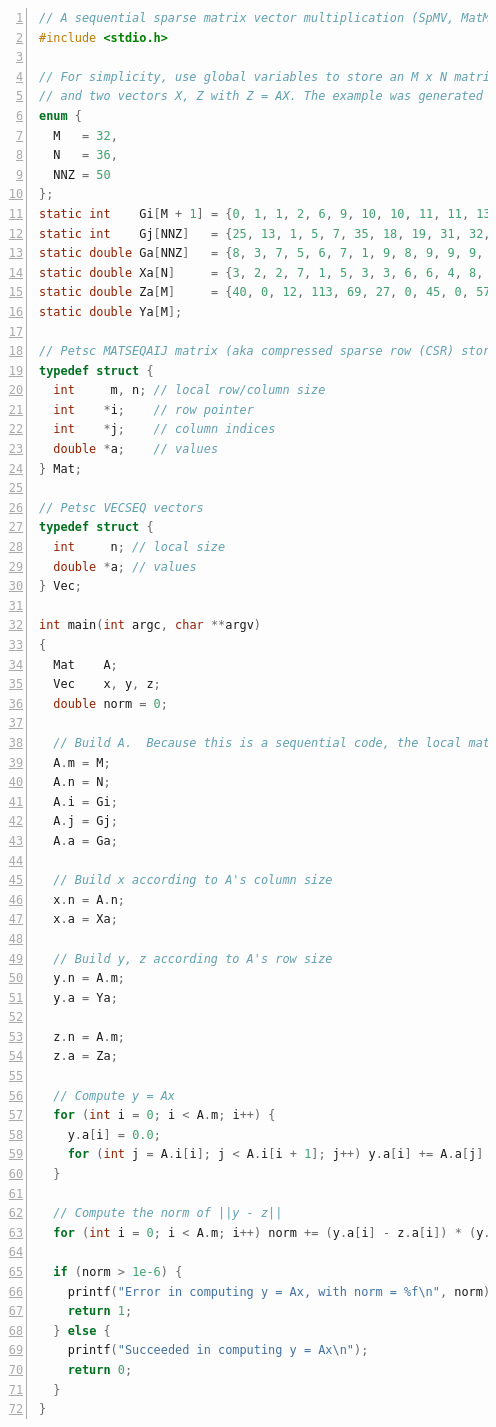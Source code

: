 \documentclass[creativecommons]{eptcs}
\begin{document}
\begin{lstlisting}[language=C, numbers=left]
// A sequential sparse matrix vector multiplication (SpMV, MatMult in PETSc)
#include <stdio.h>

// For simplicity, use global variables to store an M x N matrix A with NNZ nonzeros in the CSR format,
// and two vectors X, Z with Z = AX. The example was generated by the Python script crs.py
enum {
  M   = 32,
  N   = 36,
  NNZ = 50
};
static int    Gi[M + 1] = {0, 1, 1, 2, 6, 9, 10, 10, 11, 11, 13, 13, 13, 16, 17, 18, 18, 19, 20, 22, 23, 27, 28, 31, 32, 34, 37, 37, 41, 44, 44, 47, 49};
static int    Gj[NNZ]   = {25, 13, 1, 5, 7, 35, 18, 19, 31, 32, 21, 32, 33, 0, 8, 27, 16, 25, 3, 24, 17, 27, 13, 3, 28, 29, 30, 2, 23, 29, 31, 10, 8, 29, 1, 20, 22, 3, 8, 16, 19, 10, 14, 24, 2, 6, 15, 17, 34};
static double Ga[NNZ]   = {8, 3, 7, 5, 6, 7, 1, 9, 8, 9, 9, 9, 5, 1, 5, 8, 4, 4, 2, 11, 3, 8, 9, 7, 7, 4, 2, 2, 7, 6, 9, 3, 4, 2, 2, 9, 7, 4, 7, 8, 1, 8, 6, 1, 3, 3, 6, 6, 1};
static double Xa[N]     = {3, 2, 2, 7, 1, 5, 3, 3, 6, 6, 4, 8, 8, 4, 7, 8, 9, 7, 7, 6, 9, 5, 8, 5, 7, 5, 5, 5, 2, 4, 8, 1, 3, 6, 9, 8};
static double Za[M]     = {40, 0, 12, 113, 69, 27, 0, 45, 0, 57, 0, 0, 73, 36, 20, 0, 14, 77, 61, 36, 95, 4, 68, 12, 32, 141, 0, 148, 81, 0, 63, 51};
static double Ya[M];

// Petsc MATSEQAIJ matrix (aka compressed sparse row (CSR) storage)
typedef struct {
  int     m, n; // local row/column size
  int    *i;    // row pointer
  int    *j;    // column indices
  double *a;    // values
} Mat;

// Petsc VECSEQ vectors
typedef struct {
  int     n; // local size
  double *a; // values
} Vec;

int main(int argc, char **argv)
{
  Mat    A;
  Vec    x, y, z;
  double norm = 0;

  // Build A.  Because this is a sequential code, the local matrix takes all
  A.m = M;
  A.n = N;
  A.i = Gi;
  A.j = Gj;
  A.a = Ga;

  // Build x according to A's column size
  x.n = A.n;
  x.a = Xa;

  // Build y, z according to A's row size
  y.n = A.m;
  y.a = Ya;

  z.n = A.m;
  z.a = Za;

  // Compute y = Ax
  for (int i = 0; i < A.m; i++) {
    y.a[i] = 0.0;
    for (int j = A.i[i]; j < A.i[i + 1]; j++) y.a[i] += A.a[j] * x.a[A.j[j]];
  }

  // Compute the norm of ||y - z||
  for (int i = 0; i < A.m; i++) norm += (y.a[i] - z.a[i]) * (y.a[i] - z.a[i]);

  if (norm > 1e-6) {
    printf("Error in computing y = Ax, with norm = %f\n", norm);
    return 1;
  } else {
    printf("Succeeded in computing y = Ax\n");
    return 0;
  }
}
\end{lstlisting}
\end{document}
